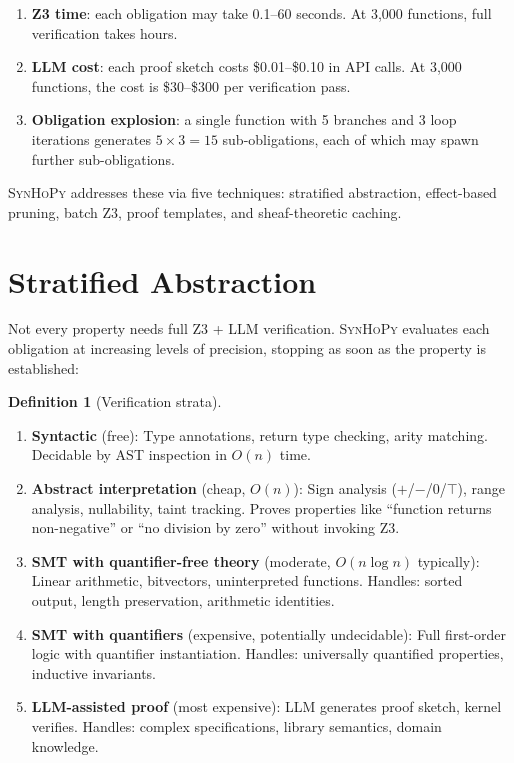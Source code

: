 \documentclass[11pt,a4paper]{report}
\theoremstyle{definition}
\newtheorem{definition}{Definition}[chapter]
\theoremstyle{plain}
\newcommand{\synhopy}{\textsc{SynHoPy}}
\begin{document}
\begin{enumerate}
  \item \textbf{Z3 time}: each obligation may take 0.1--60 seconds. At 3,000
    functions, full verification takes hours.
  \item \textbf{LLM cost}: each proof sketch costs \$0.01--\$0.10 in API calls.
    At 3,000 functions, the cost is \$30--\$300 per verification pass.
  \item \textbf{Obligation explosion}: a single function with 5 branches and 3
    loop iterations generates $5 \times 3 = 15$ sub-obligations, each of which
    may spawn further sub-obligations.
\end{enumerate}

\synhopy{} addresses these via five techniques: stratified abstraction, effect-based
pruning, batch Z3, proof templates, and sheaf-theoretic caching.

\section{Stratified Abstraction}
\label{sec:stratified}

Not every property needs full Z3 + LLM verification.  \synhopy{} evaluates
each obligation at increasing levels of precision, stopping as soon as the
property is established:

\begin{definition}[Verification strata]
\begin{enumerate}
  \item[\textbf{Level 0}] \textbf{Syntactic} (free):
    Type annotations, return type checking, arity matching.
    Decidable by AST inspection in $O(n)$ time.
  \item[\textbf{Level 1}] \textbf{Abstract interpretation} (cheap, $O(n)$):
    Sign analysis ($+$/$-$/0/$\top$), range analysis, nullability, taint tracking.
    Proves properties like ``function returns non-negative'' or ``no division by zero''
    without invoking Z3.
  \item[\textbf{Level 2}] \textbf{SMT with quantifier-free theory} (moderate, $O(n \log n)$ typically):
    Linear arithmetic, bitvectors, uninterpreted functions.
    Handles: sorted output, length preservation, arithmetic identities.
  \item[\textbf{Level 3}] \textbf{SMT with quantifiers} (expensive, potentially undecidable):
    Full first-order logic with quantifier instantiation.
    Handles: universally quantified properties, inductive invariants.
  \item[\textbf{Level 4}] \textbf{LLM-assisted proof} (most expensive):
    LLM generates proof sketch, kernel verifies.
    Handles: complex specifications, library semantics, domain knowledge.
\end{enumerate}
\end{definition}
\end{document}
